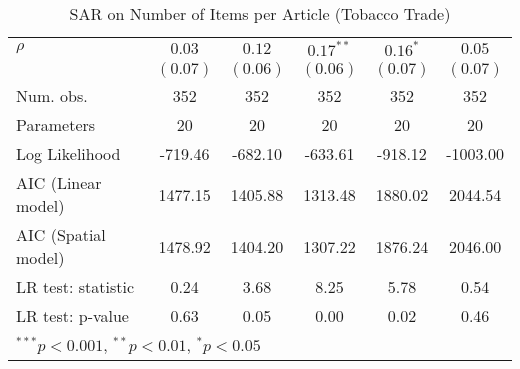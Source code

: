\begin{table}[!h]
\begin{center}
\begin{tabular}{l c c c c c }
$\rho$                  & $0.03$       & $0.12$       & $0.17^{**}$  & $0.16^{*}$   & $0.05$       \\
                        & $(0.07)$     & $(0.06)$     & $(0.06)$     & $(0.07)$     & $(0.07)$     \\
\midrule
Num. obs.               & 352          & 352          & 352          & 352          & 352          \\
Parameters              & 20           & 20           & 20           & 20           & 20           \\
Log Likelihood          & -719.46      & -682.10      & -633.61      & -918.12      & -1003.00     \\
AIC (Linear model)      & 1477.15      & 1405.88      & 1313.48      & 1880.02      & 2044.54      \\
AIC (Spatial model)     & 1478.92      & 1404.20      & 1307.22      & 1876.24      & 2046.00      \\
LR test: statistic      & 0.24         & 3.68         & 8.25         & 5.78         & 0.54         \\
LR test: p-value        & 0.63         & 0.05         & 0.00         & 0.02         & 0.46         \\
\bottomrule
\multicolumn{6}{l}{\scriptsize{$^{***}p<0.001$, $^{**}p<0.01$, $^*p<0.05$}}
\end{tabular}
\caption{SAR on Number of Items per Article (Tobacco Trade)}
\label{table:coefficients}
\end{center}
\end{table}
